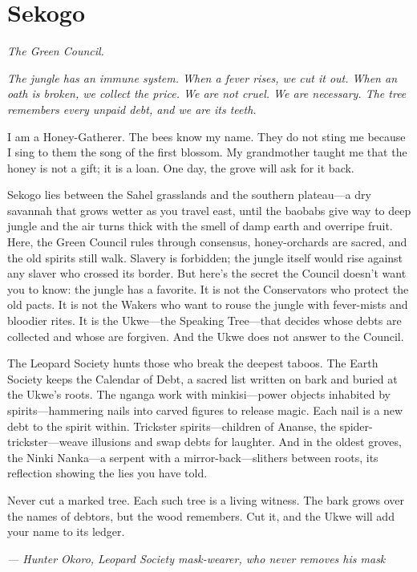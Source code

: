 \newpage

\newpage

\chapter{Sekogo}
\emph{The Green Council.}

\noindent
{\Large
\textit{The jungle has an immune system. When a fever rises, we cut it out. When an oath is broken, we collect the price. We are not cruel. We are necessary. The tree remembers every unpaid debt, and we are its teeth.}

\vspace{0.5em}

I am a Honey-Gatherer. The bees know my name. They do not sting me because I sing to them the song of the first blossom. My grandmother taught me that the honey is not a gift; it is a loan. One day, the grove will ask for it back.

\vspace{0.5em}

Sekogo lies between the Sahel grasslands and the southern plateau---a dry savannah that grows wetter as you travel east, until the baobabs give way to deep jungle and the air turns thick with the smell of damp earth and overripe fruit. Here, the Green Council rules through consensus, honey-orchards are sacred, and the old spirits still walk. Slavery is forbidden; the jungle itself would rise against any slaver who crossed its border. But here's the secret the Council doesn't want you to know: the jungle has a favorite. It is not the Conservators who protect the old pacts. It is not the Wakers who want to rouse the jungle with fever-mists and bloodier rites. It is the Ukwe---the Speaking Tree---that decides whose debts are collected and whose are forgiven. And the Ukwe does not answer to the Council.

\vspace{0.5em}

The Leopard Society hunts those who break the deepest taboos. The Earth Society keeps the Calendar of Debt, a sacred list written on bark and buried at the Ukwe's roots. The nganga work with minkisi---power objects inhabited by spirits---hammering nails into carved figures to release magic. Each nail is a new debt to the spirit within. Trickster spirits---children of Ananse, the spider-trickster---weave illusions and swap debts for laughter. And in the oldest groves, the Ninki Nanka---a serpent with a mirror-back---slithers between roots, its reflection showing the lies you have told.

\vspace{0.5em}

Never cut a marked tree. Each such tree is a living witness. The bark grows over the names of debtors, but the wood remembers. Cut it, and the Ukwe will add your name to its ledger.

\vspace{1em}

\noindent\textit{--- Hunter Okoro, Leopard Society mask-wearer, who never removes his mask}
}

